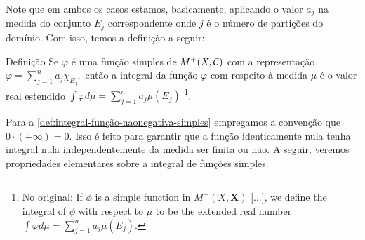 Note que em ambos os casos estamos, basicamente, aplicando o valor $a_j$ na medida do conjunto $E_j$ correspondente onde $j$ é o número de partições do domínio. Com isso, temos a definição a seguir:
\begin{env}{Definição}
\label{def:integral-função-naonegativa-simples}
    Se $\varphi$ é uma função simples de $M^+(X, \operatorname{\mathcal{C}})$ com a representação 
    $\displaystyle\varphi =  \sum_{j = 1}^n a_j\chi_{E_j},$ então a integral da função $\varphi$ com respeito à medida $\mu$ é o valor real estendido
    \linebreak $
    \displaystyle\int\varphi d\mu = \sum_{j = 1}^n a_j\mu(E_j)
    $
    \cite[p.28, tradução nossa]{bartle}
    \footnote{No original: 
    	If $\phi$ is a simple function in $M^+(X, \textbf{X})$ [...], we define the integral of $\phi$ with respect to
    	$\mu$ to be the extended real number  
    	$
    	\displaystyle\int\varphi d\mu = \sum_{j = 1}^n a_j\mu(E_j)
    	$.
    }.
\end{env}

Para a \ref{def:integral-função-naonegativa-simples} empregamos a convenção que $0 \cdot (+\infty) = 0$.
Isso é feito para garantir que a função identicamente nula tenha integral nula independentemente da medida ser finita ou não.
A seguir, veremos propriedades elementares sobre a integral de funções simples.


